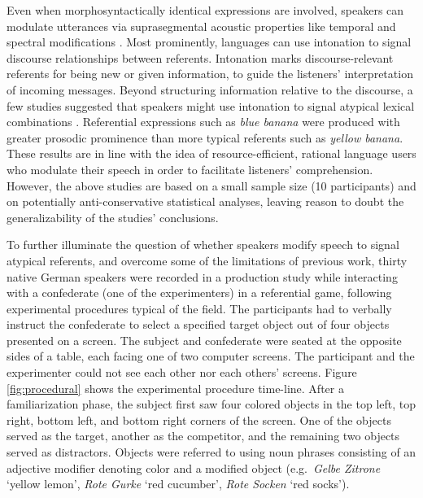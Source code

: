 \documentclass[Review,times,sageh]{sagej}
\begin{document}
Even when morphosyntactically identical expressions are involved, speakers can modulate utterances via suprasegmental acoustic properties like temporal and spectral modifications \citep[e.g.,][]{ladd2008intonational}.
Most prominently, languages can use intonation to signal discourse relationships between referents.
Intonation marks discourse-relevant referents for being new or given information, to guide the listeners' interpretation of incoming messages.
Beyond structuring information relative to the discourse, a few studies suggested that speakers might use intonation to signal atypical lexical combinations \citep[e.g.][]{dimitrova2008prosodic, dimitrova2009did}.
Referential expressions such as \emph{blue banana} were produced with greater prosodic prominence than more typical referents such as \emph{yellow banana}.
These results are in line with the idea of resource-efficient, rational language users who modulate their speech in order to facilitate listeners' comprehension.
However, the above studies are based on a small sample size (10 participants) and on potentially anti-conservative statistical analyses, leaving reason to doubt the generalizability of the studies' conclusions.

To further illuminate the question of whether speakers modify speech to signal atypical referents, and overcome some of the limitations of previous work, thirty native German speakers were recorded in a production study while interacting with a confederate (one of the experimenters) in a referential game, following experimental procedures typical of the field.
The participants had to verbally instruct the confederate to select a specified target object out of four objects presented on a screen.
The subject and confederate were seated at the opposite sides of a table, each facing one of two computer screens.
The participant and the experimenter could not see each other nor each others' screens.
Figure \ref{fig:procedural} shows the experimental procedure time-line.
After a familiarization phase, the subject first saw four colored objects in the top left, top right, bottom left, and bottom right corners of the screen.
One of the objects served as the target, another as the competitor, and the remaining two objects served as distractors.
Objects were referred to using noun phrases consisting of an adjective modifier denoting color and a modified object (e.g.~\emph{Gelbe Zitrone} `yellow lemon', \emph{Rote Gurke} `red cucumber', \emph{Rote Socken} `red socks').
\end{document}
